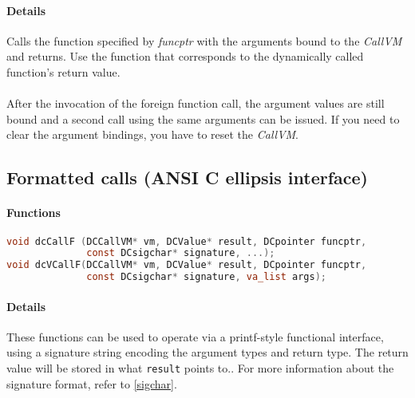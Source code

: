 \paragraph{Details}
Calls the function specified by \emph{funcptr} with the arguments bound to
the \emph{CallVM} and returns. Use the function that corresponds to the
dynamically called function's return value.\\
\\
After the invocation of the foreign function call, the argument values are
still bound and a second call using the same arguments can be issued. If you
need to clear the argument bindings, you have to reset the \emph{CallVM}.

\subsection{Formatted calls (ANSI C ellipsis interface)}

\paragraph{Functions}

\begin{lstlisting}[language=c]
void dcCallF (DCCallVM* vm, DCValue* result, DCpointer funcptr, 
              const DCsigchar* signature, ...);
void dcVCallF(DCCallVM* vm, DCValue* result, DCpointer funcptr, 
              const DCsigchar* signature, va_list args);
\end{lstlisting}

\paragraph{Details}

These functions can be used to operate  via a printf-style
functional interface, using a signature string encoding the argument types and 
return type. The return value will be stored in what \lstinline{result} points to..
For more information about the signature format, refer to \ref{sigchar}.


